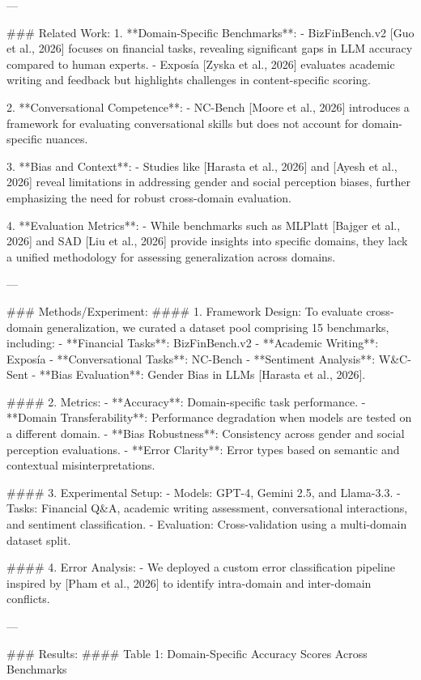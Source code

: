 ---

### Related Work:
1. **Domain-Specific Benchmarks**:
   - BizFinBench.v2 [Guo et al., 2026] focuses on financial tasks, revealing significant gaps in LLM accuracy compared to human experts.
   - Exposía [Zyska et al., 2026] evaluates academic writing and feedback but highlights challenges in content-specific scoring.

2. **Conversational Competence**:
   - NC-Bench [Moore et al., 2026] introduces a framework for evaluating conversational skills but does not account for domain-specific nuances.

3. **Bias and Context**:
   - Studies like [Harasta et al., 2026] and [Ayesh et al., 2026] reveal limitations in addressing gender and social perception biases, further emphasizing the need for robust cross-domain evaluation.

4. **Evaluation Metrics**:
   - While benchmarks such as MLPlatt [Bajger et al., 2026] and SAD [Liu et al., 2026] provide insights into specific domains, they lack a unified methodology for assessing generalization across domains.

---

### Methods/Experiment:
#### 1. Framework Design:
To evaluate cross-domain generalization, we curated a dataset pool comprising 15 benchmarks, including:
   - **Financial Tasks**: BizFinBench.v2
   - **Academic Writing**: Exposía
   - **Conversational Tasks**: NC-Bench
   - **Sentiment Analysis**: W&C-Sent
   - **Bias Evaluation**: Gender Bias in LLMs [Harasta et al., 2026].

#### 2. Metrics:
   - **Accuracy**: Domain-specific task performance.
   - **Domain Transferability**: Performance degradation when models are tested on a different domain.
   - **Bias Robustness**: Consistency across gender and social perception evaluations.
   - **Error Clarity**: Error types based on semantic and contextual misinterpretations.

#### 3. Experimental Setup:
   - Models: GPT-4, Gemini 2.5, and Llama-3.3.
   - Tasks: Financial Q&A, academic writing assessment, conversational interactions, and sentiment classification.
   - Evaluation: Cross-validation using a multi-domain dataset split.

#### 4. Error Analysis:
   - We deployed a custom error classification pipeline inspired by [Pham et al., 2026] to identify intra-domain and inter-domain conflicts.

---

### Results:
#### Table 1: Domain-Specific Accuracy Scores Across Benchmarks

